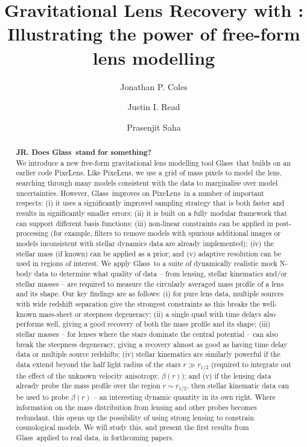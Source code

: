 \documentclass[galley]{mn2e}
\title[\Glass]{Gravitational Lens Recovery with \Glass: Illustrating the power of free-form lens modelling}
\author{%
Jonathan P. Coles 
\and 
Justin I. Read
\and 
Prasenjit Saha 
}
\newcommand{\Glass}{{\sc Glass}}
\newcommand{\PixeLens}{{\sc PixeLens}}
\begin{document}
\maketitle

\begin{abstract}
{\bf JR. Does \Glass\ stand for something?}\\
We introduce a new free-form gravitational lens modelling tool \Glass\ that builds on an earlier code \PixeLens. Like \PixeLens, we use a grid of mass pixels to model the lens, searching through many models consistent with the data to marginalise over model uncertainties. However, \Glass\ improves on \PixeLens\ in a number of important respects: (i) it uses a significantly improved sampling strategy that is both faster and results in significantly smaller errors; (ii) it is built on a fully modular framework that can support different basis functions; (iii) non-linear constraints can be applied in post-processing (for example, filters to remove models with spurious additional images or models inconsistent with stellar dynamics data are already implemented); (iv) the stellar mass (if known) can be applied as a prior; and (v) adaptive resolution can be used in regions of interest. We apply \Glass\ to a suite of dynamically realistic mock N-body data to determine what quality of data -- from lensing, stellar kinematics and/or stellar masses -- are required to measure the circularly averaged mass profile of a lens and its shape. Our key findings are as follows: (i) for pure lens data, multiple sources with wide redshift separation give the strongest constraints as this breaks the well-known mass-sheet or steepness degeneracy; (ii) a single quad with time delays also performs well, giving a good recovery of both the mass profile and its shape; (iii) stellar masses -- for lenses where the stars dominate the central potential -- can also break the steepness degeneracy, giving a recovery almost as good as having time delay data or multiple source redshifts; (iv) stellar kinematics are similarly powerful if the data extend beyond the half light radius of the stars $r \gg r_{1/2}$ (required to integrate out the effect of the unknown velocity anisotropy, $\beta(r)$); and (v) if the lensing data already probe the mass profile over the region $r \sim r_{1/2}$, then stellar kinematic data can be used to probe $\beta(r)$ -- an interesting dynamic quantity in its own right. Where information on the mass distribution from lensing and other probes becomes redundant, this opens up the possibility of using strong lensing to constrain cosmological models. We will study this, and present the first results from \Glass\ applied to real data, in forthcoming papers.
\end{abstract}
\end{document}

